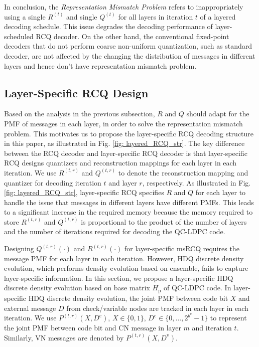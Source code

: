 \documentclass [PhD] {uclathes}
\begin{document}
In conclusion, the \textit{Representation Mismatch Problem} refers to inappropriately using a single $R^{(t)}$ and single $Q^{(t)}$ for all layers in iteration $t$  of a layered decoding schedule. This issue degrades the decoding performance of layer-scheduled RCQ decoder.  On the other hand, the conventional fixed-point decoders that do not perform coarse non-uniform quantization, such as standard \minsum decoder,  are not affected by the changing the distribution of messages in different layers and hence don't have representation mismatch problem.

\subsection{Layer-Specific RCQ Design}
Based on the analysis in the previous subsection,  $R$ and $Q$ should adapt for the PMF of messages in each layer, in order to solve the representation mismatch problem. This motivates us to propose the layer-specific RCQ decoding structure in this paper, as illustrated in Fig. \ref{fig: layered_RCQ_str}. The key difference between the RCQ decoder and layer-specific RCQ decoder is that layer-specific RCQ designs quantizers and reconstruction mappings for each layer in each iteration.  We use $R^{(t,r)}$ and $Q^{(t,r)}$ to denote the reconstruction mapping and quantizer for decoding iteration $t$ and layer $r$, respectively. 
As illustrated in Fig. \ref{fig: layered_RCQ_str}, layer-specific RCQ specifies $R$ and $Q$ for each layer to handle the issue that messages in different layers have different PMFs. This leads to a significant increase in the required memory because the memory required to store $R^{(t,r)}$ and $Q^{(t,r)}$ is proportional to the product of the number of layers and the number of iterations required for decoding the QC-LDPC code.

Designing $Q^{(t,r)}(\cdot)$ and $R^{(t,r)}(\cdot)$ for layer-specific msRCQ requires the message PMF for each layer in each iteration.  However, HDQ discrete density evolution\cite{Wang2020-RCQ}, which performs density evolution based on ensemble, fails to capture layer-specific information. In this section, we propose a layer-specific HDQ discrete density evolution based on base matrix $H_\text{p}$ of QC-LDPC code. In layer-specific HDQ discrete density evolution, the joint PMF between code bit $X$ and external message $D$ from check/variable nodes are tracked in each layer in each iteration. We use $P^{(t,r)}(X,D^\text{c})$, $X\in\{0,1\}$, $D^\text{c}\in\{0,\ldots,2^{b^\text{e}}-1\}$ to represent the joint PMF between code bit and CN message in layer $m$ and iteration $t$. Similarly, VN messages are denoted by $P^{(t,r)}(X,D^\text{v})$.
\end{document}
